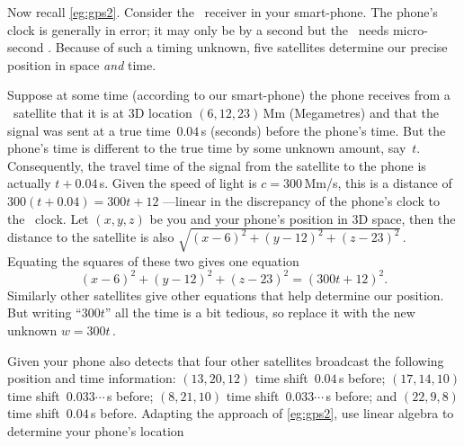 \begin{example} \label{eg:gps3t}
Now recall \cref{eg:gps2}.
Consider the \gps\ receiver in your smart-phone.
The phone's clock is generally in error; it may only be by a second but the \gps\ needs micro-second . 
Because of such a timing unknown, five satellites determine our precise position in space \emph{and} time.

Suppose at some time (according to our smart-phone) the phone receives from a \gps\ satellite that it is at 3D location \((6,12,23)\)\,Mm (Megametres) and that the signal was sent at a true time~\(0.04\)\,s (seconds) before the phone's time.
But the phone's time is different to the true time by some unknown amount, say~\(t\).
Consequently, the travel time of the signal from the satellite to the phone is actually \(t+0.04\)\,s.
Given the speed of light is \(c=300\)\,Mm/s, this is a distance of \(300(t+0.04)=300t+12\) ---linear in the discrepancy of the phone's clock to the \gps\ clock.
Let \((x,y,z)\) be you and your phone's position in 3D space, then the distance to the satellite is also \(\sqrt{(x-6)^2+(y-12)^2+(z-23)^2}\)\,.
Equating the squares of these two gives one equation
\begin{equation*}
(x-6)^2+(y-12)^2+(z-23)^2=(300t+12)^2.
\end{equation*}
Similarly other satellites give other equations that help determine our position.
But writing ``\(300t\)'' all the time is a bit tedious, so replace it with the new unknown \(w=300t\)\,.

Given your phone also detects that four other satellites broadcast the following position and time information:
\((13,20,12)\) time shift~\(0.04\)\,s before;
\((17,14,10)\) time shift~\(0.033\cdots\)\,s before;
\((8,21,10)\) time shift~\(0.033\cdots\)\,s before; and
\((22,9,8)\) time shift~\(0.04\)\,s before.
Adapting the approach of \cref{eg:gps2}, use linear algebra to determine your phone's location 


\end{example}
